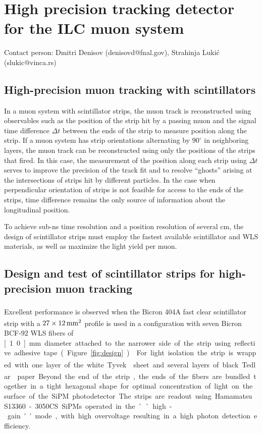 \section{High precision tracking detector for the ILC muon system}

Contact person: Dmitri Denisov (denisovd@fnal.gov), Strahinja Lukić (slukic@vinca.rs)

\subsection{High-precision muon tracking with scintillators}

In a muon system with scintillator strips, the muon track is reconstructed using observables such as the position of the strip hit by a passing muon and the signal time difference $\Delta t$ between the ends of the strip to measure position along the strip. If a muon system has strip orientations alternating by $90^{\circ}$ in neighboring layers, the muon track can be reconstructed using only the positions of the strips that fired. In this case, the measurement of the position along each strip using $\Delta t$ serves to improve the precision of the track fit and to resolve ``ghosts'' arising at the intersections of strips hit by different particles. In the case when perpendicular orientation of strips is not feasible for access to the ends of the strips, time difference remains the only source of information about the longitudinal position.

To achieve sub-ns time resolution and a position resolution of several cm, the design of scintillator strips must employ the fastest available scintillator and WLS materials, as well as maximize the light yield per muon.

\subsection{Design and test of scintillator strips for high-precision muon tracking}

Excellent performance is observed when the Bicron\textsuperscript{\textcopyright} 404A fast clear scintillator strip with a $27 \times \unit[12]{mm^2}$ profile is used in a configuration with seven Bicron\textsuperscript{\textcopyright} BCF-92 WLS fibers of \unit[1.0]{mm} diameter attached to the narrower side of the strip using reflective adhesive tape (Figure~\ref{fig:design}) \cite{Denisov2016120}. For light isolation the strip is wrapped with one layer of the white Tyvek\textsuperscript{\textregistered} sheet and several layers of black Tedlar\textsuperscript{\textregistered} paper. Beyond the end of the strip, the ends of the fibers are bundled together in a tight hexagonal shape for optimal concentration of light on the surface of the SiPM photodetector. The strips are readout using Hamamatsu S13360-3050CS SiPMs operated in the ``high-gain'' mode, with high overvoltage resulting in a high photon detection efficiency.

